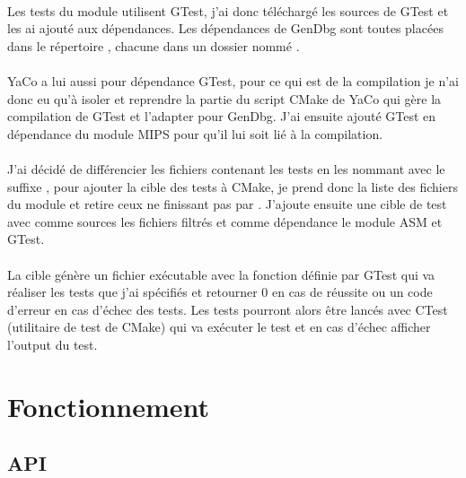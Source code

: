 \documentclass[11pt, book, english, french, standardlists]{upmethodology-document}
\begin{document}
				\paragraph*{}
					Les tests du module utilisent \gls{GTest}, j'ai donc téléchargé les sources de \gls{GTest}\cite{GithubGTest} et les ai ajouté aux dépendances. Les dépendances de GenDbg sont toutes placées dans le répertoire , chacune dans un dossier nommé .
				\paragraph*{}
					YaCo a lui aussi pour dépendance \gls{GTest}, pour ce qui est de la compilation je n'ai donc eu qu'à isoler et reprendre la partie du script CMake de YaCo qui gère la compilation de \gls{GTest} et l'adapter pour GenDbg. J'ai ensuite ajouté \gls{GTest} en dépendance du module \acrshort{MIPS} pour qu'il lui soit lié à la compilation.
				\paragraph*{}
					J'ai décidé de différencier les fichiers contenant les tests en les nommant avec le suffixe , pour ajouter la cible des tests à CMake, je prend donc la liste des fichiers du module et retire ceux ne finissant pas par . J'ajoute ensuite une cible de test avec comme sources les fichiers filtrés et comme dépendance le module ASM et \gls{GTest}.
				\paragraph*{}
					La cible génère un fichier exécutable avec la fonction  définie par \gls{GTest} qui va réaliser les tests que j'ai spécifiés et retourner 0 en cas de réussite ou un code d'erreur en cas d'échec des tests. Les tests pourront alors être lancés avec CTest (utilitaire de test de CMake) qui va exécuter le test et en cas d'échec afficher l'output du test.
		\section{Fonctionnement}
			\subsection{API}
\end{document}
